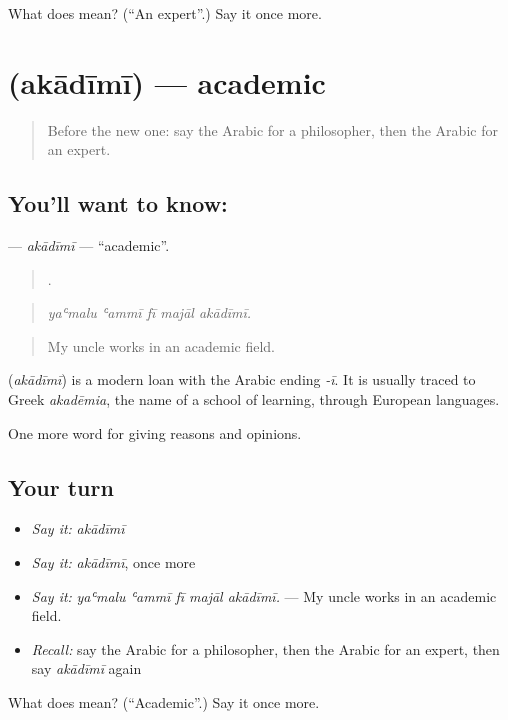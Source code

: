 \begin{tcolorbox}[breakable,colback=teal!4,colframe=teal!35!black,title={Before you move on}]
What does  mean? (\textquotedblleft{}An expert\textquotedblright{}.) Say it once more.
\end{tcolorbox}
\section[\texorpdfstring{\ar{أكاديمي} (akādīmī)}{أكاديمي (akādīmī)}]{ (akādīmī) — academic}

\label{lesson:AR-C376-akadimi}



\begin{quote}
Before the new one: say the Arabic for a philosopher, then the Arabic for an expert.
\end{quote}

\subsection*{You'll want to know: }
\textbf{} — \emph{akādīmī} — \textquotedblleft{}academic\textquotedblright{}.

\begin{quote}
    .
\end{quote}

\begin{quote}
\emph{yaʿmalu ʿammī fī majāl akādīmī.}
\end{quote}

\begin{quote}
My uncle works in an academic field.
\end{quote}

\begin{cousinweb}
\textbf{} (\emph{akādīmī}) is a modern loan with the Arabic ending \emph{-ī}. It is usually traced to Greek \emph{akadēmia}, the name of a school of learning, through European languages.
\end{cousinweb}

\begin{grammarlens}[title={What you've built}]
One more word for giving reasons and opinions.
\end{grammarlens}

\subsection*{Your turn}
\begin{itemize}
\raggedright
  \item \emph{Say it:} \emph{akādīmī}
  \item \emph{Say it:} \emph{akādīmī}, once more
  \item \emph{Say it:} \emph{yaʿmalu ʿammī fī majāl akādīmī.} — My uncle works in an academic field.
  \item \emph{Recall:} say the Arabic for a philosopher, then the Arabic for an expert, then say \emph{akādīmī} again
\end{itemize}

\begin{tcolorbox}[breakable,colback=teal!4,colframe=teal!35!black,title={Before you move on}]
What does  mean? (\textquotedblleft{}Academic\textquotedblright{}.) Say it once more.
\end{tcolorbox}
